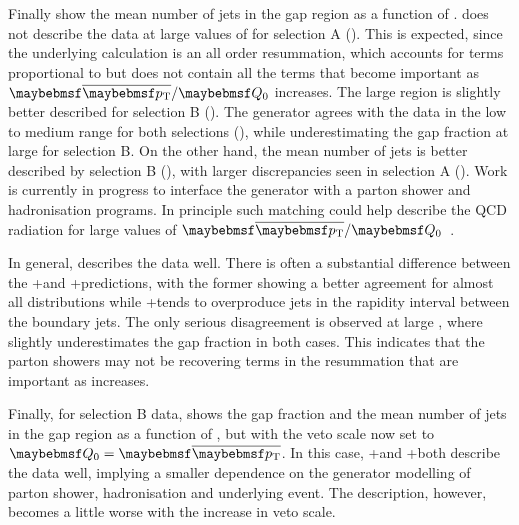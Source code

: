 Finally  show the mean
number of jets in the gap region as a function of \DeltaY. \HEJ does not
describe the data at large values of \pTbar for selection A
(). This is
expected, since the underlying calculation is an all order resummation, which
accounts for terms proportional to \DeltaY but does not contain all the terms
that become important as $\pTbar / \Qnought$ increases. The large \pTbar region is
slightly better described  for selection B
().  The \HEJ
generator agrees with the data in the low to medium \DeltaY range for both
selections (),
while underestimating the gap fraction at large \DeltaY for selection B. On the other
hand, the mean number  of jets is better described by selection B (),
with larger discrepancies seen in selection A (). Work is currently
in progress to interface the \HEJ generator with a parton shower and hadronisation
programs. In principle such matching could help describe the QCD radiation for large
values of $\pTbar / \Qnought$~\cite{Andersen:2011:HEJShowered}.

In general, \Powheg describes the data well. There is often a substantial difference
between the \Powheg+\Pythia and \Powheg+\Herwig predictions, with the former showing
a better agreement for almost all distributions while \Powheg+\Herwig tends to
overproduce jets in the rapidity interval between the boundary jets. The
only serious disagreement is observed at large \DeltaY, where \Powheg slightly
underestimates the gap fraction in both cases. This indicates that the parton
showers may not be recovering terms in the resummation that are important as \DeltaY
increases. 

Finally, for selection B data,  shows the gap fraction
and  the mean number of jets in the gap region as a function of
\DeltaY, but with the veto scale now set to $\Qnought = \pTbar$. In this case,
\Powheg+\Pythia and \Powheg+\Herwig both describe the data well, implying
a smaller dependence on the generator modelling of parton shower, hadronisation and
underlying event. The \HEJ description, however, becomes a little worse with the
increase in veto scale.


